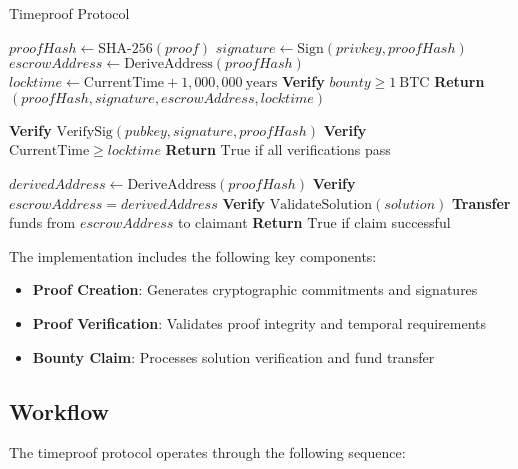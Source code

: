 \documentclass[12pt]{report}
\begin{document}
\begin{algorithm}
\caption{Timeproof Protocol}
\begin{algorithmic}[1]
    \State $proofHash \gets \text{SHA-256}(proof)$
    \State $signature \gets \text{Sign}(privkey, proofHash)$
    \State $escrowAddress \gets \text{DeriveAddress}(proofHash)$
    \State $locktime \gets \text{CurrentTime} + 1,000,000\ \text{years}$
    \State \textbf{Verify} $bounty \geq 1\ \text{BTC}$
    \State \textbf{Return} $(proofHash, signature, escrowAddress, locktime)$
\EndProcedure

    \State \textbf{Verify} $\text{VerifySig}(pubkey, signature, proofHash)$
    \State \textbf{Verify} $\text{CurrentTime} \geq locktime$
    \State \textbf{Return} $\text{True}$ if all verifications pass
\EndProcedure

    \State $derivedAddress \gets \text{DeriveAddress}(proofHash)$
    \State \textbf{Verify} $escrowAddress = derivedAddress$
    \State \textbf{Verify} $\text{ValidateSolution}(solution)$
    \State \textbf{Transfer} funds from $escrowAddress$ to claimant
    \State \textbf{Return} $\text{True}$ if claim successful
\EndProcedure
\end{algorithmic}
\end{algorithm}

The implementation includes the following key components:

\begin{itemize}
    \item \textbf{Proof Creation}: Generates cryptographic commitments and signatures
    \item \textbf{Proof Verification}: Validates proof integrity and temporal requirements
    \item \textbf{Bounty Claim}: Processes solution verification and fund transfer
\end{itemize}

\subsection{Workflow}

The timeproof protocol operates through the following sequence:
\end{document}
